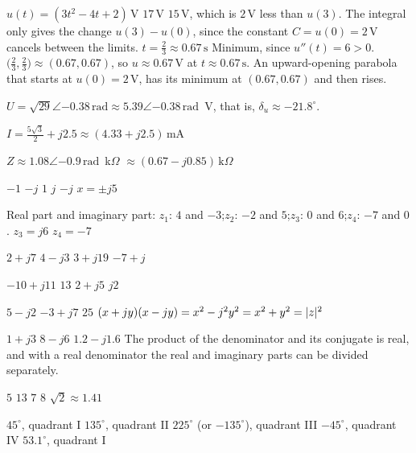 
\begin{facit}

  $u(t) = (3t^2 - 4t + 2)\,\text{V}$  $17\,\text{V}$
 $15\,\text{V}$, which is $2\,\text{V}$ less than $u(3)$. The integral only gives the change
$u(3) - u(0)$, since the constant $C = u(0) = 2\,\text{V}$ cancels between the limits.
 $t = \frac{2}{3} \approx 0.67\,\text{s}$
 Minimum, since $u''(t) = 6 > 0$.
 $\bigl(\frac{2}{3}, \frac{2}{3}\bigr) \approx (0.67, 0.67)$, so $u \approx 0.67\,\text{V}$ at
$t \approx 0.67\,\text{s}$.
 An upward-opening parabola that starts at $u(0) = 2\,\text{V}$, has its minimum at
$(0.67, 0.67)$ and then rises.

 $U = \sqrt{29}\angle{-0.38}\,\text{rad} \approx 5.39\angle{-0.38}\,\text{rad}$~V,
that is, $\delta_u \approx -21.8^{\circ}$.

 $I = \frac{5\sqrt{3}}{2} + j2.5 \approx (4.33 + j2.5)\,\text{mA}$

 $Z \approx 1.08\angle{-0.9}\,\text{rad}$~k$\Omega$
$\approx (0.67 - j0.85)\,\text{k}\Omega$

  $-1$  $-j$  $1$  $j$  $-j$  $x = \pm j5$

  Real part and imaginary part: $z_1$: $4$ and $-3$;\enspace $z_2$: $-2$ and
$5$;\enspace $z_3$: $0$ and $6$;\enspace $z_4$: $-7$ and $0$.
 $z_3 = j6$  $z_4 = -7$

  $2 + j7$  $4 - j3$  $3 + j19$  $-7 + j$

  $-10 + j11$  $13$  $2 + j5$  $j2$

  $5 - j2$  $-3 + j7$  $25$
 $(x + jy)(x - jy) = x^2 - j^2y^2 = x^2 + y^2 = \lvert z\rvert^2$

  $1 + j3$  $8 - j6$  $1.2 - j1.6$
 The product of the denominator and its conjugate is real, and with a real denominator the
real and imaginary parts can be divided separately.

  $5$  $13$  $7$  $8$  $\sqrt{2} \approx 1.41$

  $45^{\circ}$, quadrant I  $135^{\circ}$, quadrant II
 $225^{\circ}$ (or $-135^{\circ}$), quadrant III  $-45^{\circ}$, quadrant IV
 $53.1^{\circ}$, quadrant I


\end{facit}
